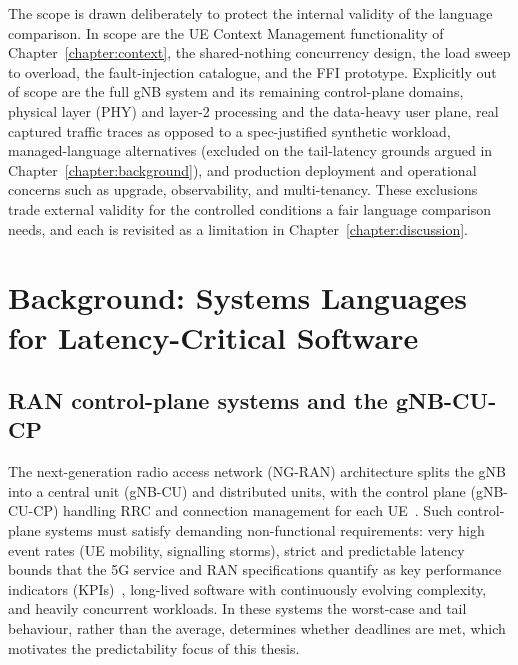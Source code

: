 \documentclass[english,oneside,a4paper,censored,csm,software-track-2020]{HYthesisML}
\begin{document}
The scope is drawn deliberately to protect the internal validity of the language comparison. In
scope are the UE Context Management functionality of Chapter~\ref{chapter:context}, the
shared-nothing concurrency design, the load sweep to overload, the fault-injection catalogue,
and the FFI prototype. Explicitly out of scope are the full gNB system and its remaining
control-plane domains, physical layer (PHY) and layer-2 processing and the data-heavy user plane,
real captured traffic traces as opposed to a spec-justified synthetic workload, managed-language
alternatives (excluded on the tail-latency grounds argued in
Chapter~\ref{chapter:background}), and production deployment and operational concerns such as
upgrade, observability, and multi-tenancy. These exclusions trade external validity for the
controlled conditions a fair language comparison needs, and each is revisited as a limitation in
Chapter~\ref{chapter:discussion}.

\chapter{Background: Systems Languages for Latency-Critical Software\label{chapter:background}}

\section{RAN control-plane systems and the gNB-CU-CP}\label{sec:ranarch}
The next-generation radio access network (NG-RAN) architecture splits the gNB into a central
unit (gNB-CU) and distributed units, with the control plane (gNB-CU-CP) handling RRC and
connection management for each UE~\cite{3gpp38401,3gpp38300,3gpp38331}. Such control-plane
systems must satisfy demanding non-functional requirements: very high event rates (UE
mobility, signalling storms), strict and predictable latency bounds that the 5G service and
RAN specifications quantify as key performance indicators
(KPIs)~\cite{3gpp38913,3gpp22261}, long-lived software with continuously evolving complexity,
and heavily concurrent workloads. In these systems the worst-case and tail behaviour,
rather than the average, determines whether deadlines are met, which motivates the
predictability focus of this thesis.
\end{document}
